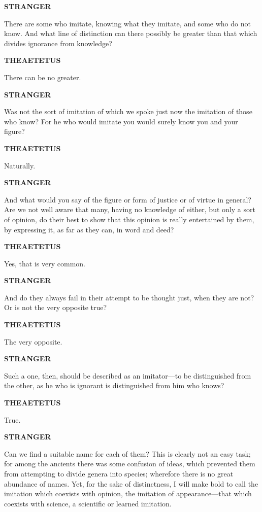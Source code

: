 \documentclass[11pt,letter]{article}
\begin{document}
\par \textbf{STRANGER}
\par   There are some who imitate, knowing what they imitate, and some who do not know. And what line of distinction can there possibly be greater than that which divides ignorance from knowledge?

\par \textbf{THEAETETUS}
\par   There can be no greater.

\par \textbf{STRANGER}
\par   Was not the sort of imitation of which we spoke just now the imitation of those who know? For he who would imitate you would surely know you and your figure?

\par \textbf{THEAETETUS}
\par   Naturally.

\par \textbf{STRANGER}
\par   And what would you say of the figure or form of justice or of virtue in general? Are we not well aware that many, having no knowledge of either, but only a sort of opinion, do their best to show that this opinion is really entertained by them, by expressing it, as far as they can, in word and deed?

\par \textbf{THEAETETUS}
\par   Yes, that is very common.

\par \textbf{STRANGER}
\par   And do they always fail in their attempt to be thought just, when they are not? Or is not the very opposite true?

\par \textbf{THEAETETUS}
\par   The very opposite.

\par \textbf{STRANGER}
\par   Such a one, then, should be described as an imitator—to be distinguished from the other, as he who is ignorant is distinguished from him who knows?

\par \textbf{THEAETETUS}
\par   True.

\par \textbf{STRANGER}
\par   Can we find a suitable name for each of them? This is clearly not an easy task; for among the ancients there was some confusion of ideas, which prevented them from attempting to divide genera into species; wherefore there is no great abundance of names. Yet, for the sake of distinctness, I will make bold to call the imitation which coexists with opinion, the imitation of appearance—that which coexists with science, a scientific or learned imitation.
\end{document}
